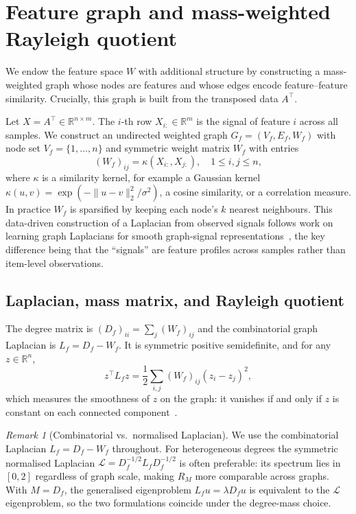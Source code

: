 \documentclass[12pt,a4paper]{article}
\theoremstyle{plain}
\theoremstyle{definition}
\theoremstyle{remark}
\newtheorem{remark}[theorem]{Remark}
\newcommand{\R}{\mathbb{R}}
\newcommand{\1}{\mathbf{1}}
\begin{document}
\section{Feature graph and mass-weighted Rayleigh quotient}
\label{sec:feature_graph}

We endow the feature space $W$ with additional structure by constructing
a mass-weighted graph whose nodes are features and whose edges encode
feature--feature similarity. Crucially, this graph is built from the
transposed data $A^\top$.

Let $X = A^\top \in \R^{n \times m}$. The $i$-th row $X_{i:} \in \R^m$
is the signal of feature $i$ across all samples. We construct an
undirected weighted graph $G_f = (V_f, E_f, W_f)$ with node set
$V_f = \{1,\dots,n\}$ and symmetric weight matrix $W_f$ with entries
\begin{equation}
    (W_f)_{ij} = \kappa(X_{i:}, X_{j:}),
    \quad 1 \le i,j \le n,
\end{equation}
where $\kappa$ is a similarity kernel, for example a Gaussian kernel
$\kappa(u,v) = \exp(-\|u-v\|_2^2 / \sigma^2)$, a cosine similarity, or a
correlation measure. In practice $W_f$ is sparsified by keeping each
node's $k$ nearest neighbours. This data-driven construction of a
Laplacian from observed signals follows work on learning graph
Laplacians for smooth graph-signal representations~\cite{dong_etal_2016},
the key difference being that the ``signals'' are feature profiles across
samples rather than item-level observations.

\subsection{Laplacian, mass matrix, and Rayleigh quotient}

The degree matrix is $(D_f)_{ii} = \sum_{j} (W_f)_{ij}$ and the
combinatorial graph Laplacian is $L_f = D_f - W_f$. It is symmetric
positive semidefinite, and for any $z \in \R^n$,
\begin{equation}
    z^\top L_f z
    = \frac{1}{2} \sum_{i,j} (W_f)_{ij} (z_i - z_j)^2,
    \label{eq:lap_quadratic}
\end{equation}
which measures the smoothness of $z$ on the graph: it vanishes if and
only if $z$ is constant on each connected
component~\cite{merris_laplacian,spielman_laplacian}.

\begin{remark}[Combinatorial vs.\ normalised Laplacian]
We use the combinatorial Laplacian $L_f = D_f - W_f$ throughout. For
heterogeneous degrees the symmetric normalised Laplacian
$\mathcal{L} = D_f^{-1/2} L_f D_f^{-1/2}$ is often preferable: its
spectrum lies in $[0,2]$ regardless of graph scale, making $R_M$ more
comparable across graphs. With $M = D_f$, the generalised eigenproblem
$L_f u = \lambda D_f u$ is equivalent to the $\mathcal{L}$ eigenproblem,
so the two formulations coincide under the degree-mass choice.
\end{remark}
\end{document}
